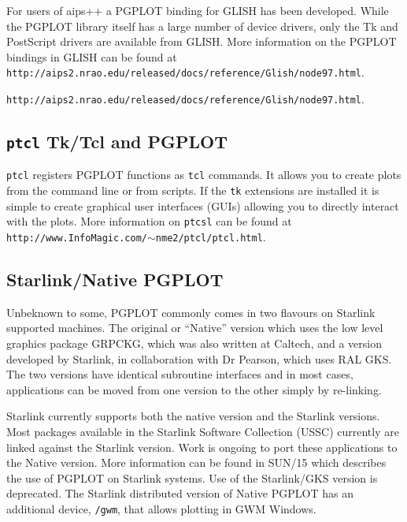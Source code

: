 \documentclass[twoside,11pt]{article}
\newcommand{\htmladdnormallink}[2]{#1}
\newcommand{\htmlref}[2]{#1}
\newcommand{\latex}[1]{#1}
\newcommand{\xref}[3]{#1}
\newcommand{\xlabel}[1]{}
\begin{document}
For users of aips++ a PGPLOT binding for \htmladdnormallink{GLISH}{http://www.cv.nrao.edu/glish/} has been developed. While the PGPLOT library itself has a large number of device drivers,
only the Tk and PostScript drivers are available from GLISH. More information on the PGPLOT bindings in GLISH can be found at \latex{{\tt http://aips2.nrao.edu/released/docs/reference/Glish/node97.html}.}
\begin{htmlonly} \htmladdnormallink{{\tt http://aips2.nrao.edu/released/docs/reference/Glish/node97.html}}{http://aips2.nrao.edu/released/docs/reference/Glish/node97.html}.
\end{htmlonly} 

\subsection{\xlabel{sc15_pgtcl}{\tt ptcl} Tk/Tcl and PGPLOT\label{sc15_pgtcl}}

\htmladdnormallink{{\tt ptcl}}{http://www.InfoMagic.com/~nme2/ptcl/ptcl.html} registers PGPLOT functions as {\tt tcl} commands.  It allows you to create plots from the command line or from scripts. If the {\tt tk} extensions are installed it is simple to create graphical user interfaces (GUIs) allowing you to directly interact with the plots. \latex{ More information on {\tt ptcsl} can be found at {\tt http://www.InfoMagic.com/$\sim$nme2/ptcl/ptcl.html}.}

\subsection{\xlabel{sc15_pgstar}Starlink/Native PGPLOT\label{sc15_pgstar}}

Unbeknown to some, PGPLOT commonly comes in two flavours on Starlink supported machines. The original or ``Native'' version which uses the low level graphics package GRPCKG, which was also written at Caltech, and a version developed by Starlink, in collaboration with Dr Pearson, which uses \htmlref{RAL GKS}{sc15_gks}. The two versions have identical subroutine
interfaces and in most cases, applications can be moved from one version to the 
other simply by re-linking. 

Starlink currently supports both the native version and the Starlink versions. Most packages available in the Starlink Software Collection (USSC) currently are linked against the Starlink version. Work is ongoing to port these applications to the Native version. More information can be found in \xref{SUN/15}{sun15}{} which describes the use of PGPLOT on Starlink systems. Use of the Starlink/GKS version is deprecated. The Starlink distributed version of Native PGPLOT has an additional device, {\tt /gwm}, that allows plotting in GWM Windows.
\end{document}
